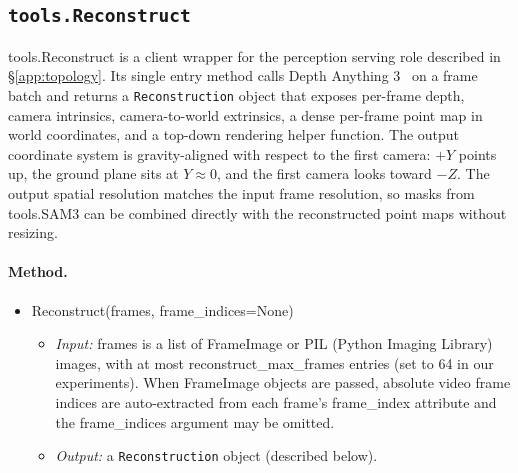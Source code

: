 \documentclass{llmxive}
\providecommand{\apicode}[1]{#1}
\begin{document}
\subsection{\texttt{tools.Reconstruct}}
\label{app:tool_reconstruct}
\apicode{tools.Reconstruct} is a client wrapper for the perception serving role described in \S\ref{app:topology}. Its single entry method calls Depth Anything 3~\citep{depthanything3} on a frame batch and returns a \texttt{Reconstruction} object that exposes per-frame depth, camera intrinsics, camera-to-world extrinsics, a dense per-frame point map in world coordinates, and a top-down rendering helper function. The output coordinate system is gravity-aligned with respect to the first camera: $+Y$ points up, the ground plane sits at $Y \approx 0$, and the first camera looks toward $-Z$. The output spatial resolution matches the input frame resolution, so masks from \apicode{tools.SAM3} can be combined directly with the reconstructed point maps without resizing.

\paragraph{Method.}
\begin{itemize}[leftmargin=1.5em]
\item \apicode{Reconstruct(frames, frame_indices=None)}
  \begin{itemize}
  \item \emph{Input:} \apicode{frames} is a list of \apicode{FrameImage} or PIL (Python Imaging Library) images, with at most \apicode{reconstruct_max_frames} entries (set to 64 in our experiments). When \apicode{FrameImage} objects are passed, absolute video frame indices are auto-extracted from each frame's \apicode{frame_index} attribute and the \apicode{frame_indices} argument may be omitted.
  \item \emph{Output:} a \texttt{Reconstruction} object (described below).
  \end{itemize}
\end{itemize}
\end{document}
